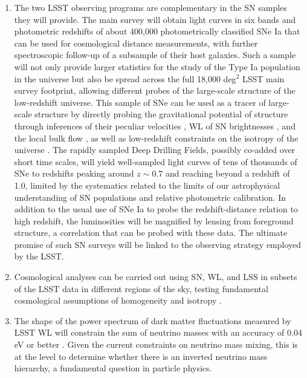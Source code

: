 \begin{enumerate}
\item The two LSST observing programs are complementary in the SN samples they will provide. The main survey will
obtain light curves in six bands and photometric redshifts of about 400,000 photometrically classified SNe
Ia that can be used for cosmological distance measurements, with further spectroscopic
follow-up of a subsample of their host galaxies.
Such a sample will not only provide larger statistics
for the study of the Type Ia population in the universe but also
be spread across the full 18,000 deg$^2$ LSST main survey footprint, allowing different probes of the large-scale structure of the low-redshift
universe. This sample of SNe can be used as a tracer of large-scale structure by directly probing the
gravitational potential of structure through inferences of their peculiar velocities
\citep{2007PhRvL..99h1301G,2011PhRvD..83d3004B,2017ApJ...847..128H}, WL of SN brightnesses
\citep{2006PhRvD..74f3515D,2014PhRvD..89b3009Q,2017MNRAS.467..259M,2017MNRAS.465.2862S}, and the local bulk flow
\citep{2000ASPC..201...80R,2011JCAP...04..015D,2012MNRAS.420..447T,2013A&A...560A..90F,2015JCAP...12..033H},
as well as low-redshift constraints on the isotropy of the universe
\citep{2010JCAP...12..012A,2011MNRAS.414..264C,2011PhRvD..83j3503C,2013PhRvD..87l3522C,2015ApJ...810...47J}.
The rapidly sampled Deep Drilling Fields, possibly co-added over short time scales,  will yield well-sampled
light curves of tens of thousands of SNe to redshifts peaking around $z\sim 0.7$ and reaching beyond a
redshift of 1.0, limited by the systematics related to the limits of our astrophysical understanding of SN
populations and relative photometric calibration. In addition to the
usual use of SNe Ia  to probe the redshift-distance
relation to high redshift, the luminosities will be magnified by
lensing from foreground structure, a correlation that can be probed
with these data.
The ultimate promise of such SN surveys will be linked to the observing strategy employed by the LSST.

\item  Cosmological analyses can be carried out using SN, WL, and LSS
  in subsets of the LSST data in different regions of the sky, testing
  fundamental cosmological
assumptions of homogeneity and isotropy
\citep[e.g.,][]{2009ApJ...690..923Z}.

\item The shape of the power spectrum of dark matter fluctuations measured by LSST WL
will constrain the sum of neutrino masses with an accuracy
of 0.04\,eV or better
\citep{1999A&A...348...31C,2004PhRvD..70f3510S,2006JCAP...06..025H}.
Given the current constraints on neutrino mass mixing, this is at the
level to determine whether there is an inverted neutrino mass hierarchy, a
fundamental question in particle physics.


\end{enumerate}
